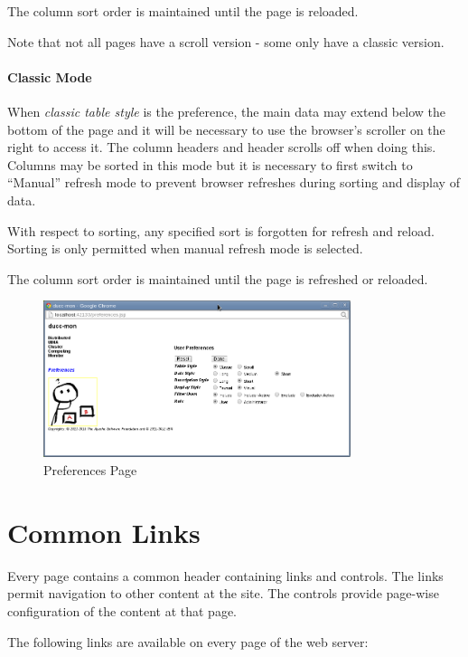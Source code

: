     The column sort order is maintained until the page is reloaded.

	Note that not all pages have a scroll version - some only have a classic version.
	
    \paragraph{Classic Mode}  When {\em classic table style} is the preference, the
    main data may extend below the bottom of the page and it will be necessary to use the browser's scroller on the right
    to access it.  The column headers and {\DUCC} header scrolls off when doing this.  Columns
    may be sorted in this mode but it is necessary to first switch to ``Manual'' refresh mode to
    prevent browser refreshes during sorting and display of data. 
    
    With respect to sorting, any specified sort is forgotten for refresh
    and reload.  Sorting is only permitted when manual refresh mode is
    selected.
    
    The column sort order is maintained until the page is refreshed or reloaded.

\begin{figure}[ht!]
\centering
\includegraphics[width=90mm]{images/ducc-webserver/Preferences.png}
\caption{Preferences Page}
\end{figure}

\ifpdf
\else
{}
\fi
    \section{Common Links}

        Every page contains a common header containing links and controls. The links permit navigation
        to other content at the site. The controls provide page-wise configuration of the content at
        that page.

        The following links are available on every page of the web server: 

